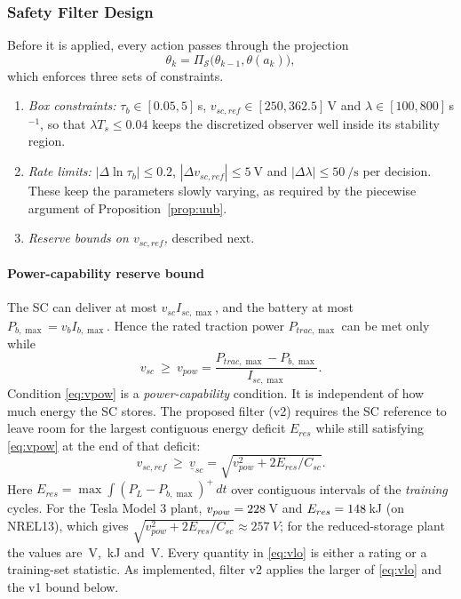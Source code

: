 \subsubsection{Safety Filter Design}
Before it is applied, every action passes through the projection
\begin{equation}
\theta_k=\Pi_{\mathcal{S}}\big(\theta_{k-1},\theta(a_k)\big),\label{eq:filter}
\end{equation}
which enforces three sets of constraints.
\begin{enumerate}
\item \emph{Box constraints:} $\tau_b\in[0.05,5]$\,s, $v_{sc,ref}\in[250,362.5]$\,V and $\lambda\in[100,800]$\,s$^{-1}$, so that $\lambda T_s\le0.04$ keeps the discretized observer well inside its stability region.
\item \emph{Rate limits:} $|\Delta\ln\tau_b|\le0.2$, $|\Delta v_{sc,ref}|\le\SI{5}{\volt}$ and $|\Delta\lambda|\le\SI{50}{\per\second}$ per decision. These keep the parameters slowly varying, as required by the piecewise argument of Proposition~\ref{prop:uub}.
\item \emph{Reserve bounds on $v_{sc,ref}$,} described next.
\end{enumerate}

\paragraph{Power-capability reserve bound}
The SC can deliver at most $v_{sc}I_{sc,\max}$, and the battery at most $P_{b,\max}=v_bI_{b,\max}$. Hence the rated traction power $P_{trac,\max}$ can be met only while
\begin{equation}
v_{sc}\ \ge\ v_{pow}=\frac{P_{trac,\max}-P_{b,\max}}{I_{sc,\max}}.\label{eq:vpow}
\end{equation}
Condition \eqref{eq:vpow} is a \emph{power-capability} condition. It is independent of how much energy the SC stores. The proposed filter (v2) requires the SC reference to leave room for the largest contiguous energy deficit $E_{res}$ while still satisfying \eqref{eq:vpow} at the end of that deficit:
\begin{equation}
v_{sc,ref}\ \ge\ \underline v_{sc}=\sqrt{v_{pow}^2+2E_{res}/C_{sc}}.\label{eq:vlo}
\end{equation}
Here $E_{res}=\max\int(P_L-P_{b,\max})^+\,dt$ over contiguous intervals of the \emph{training} cycles. For the Tesla Model 3 plant, $v_{pow}=228$\,V and $E_{res}=148$\,kJ (on NREL13), which gives $\sqrt{v_{pow}^2+2E_{res}/C_{sc}}\approx\SI{257}{V}$; for the reduced-storage plant the values are \GVpow\,V, \GEresKJ\,kJ and \GVloVtwo\,V. Every quantity in \eqref{eq:vlo} is either a rating or a training-set statistic. As implemented, filter v2 applies the larger of \eqref{eq:vlo} and the v1 bound below.

